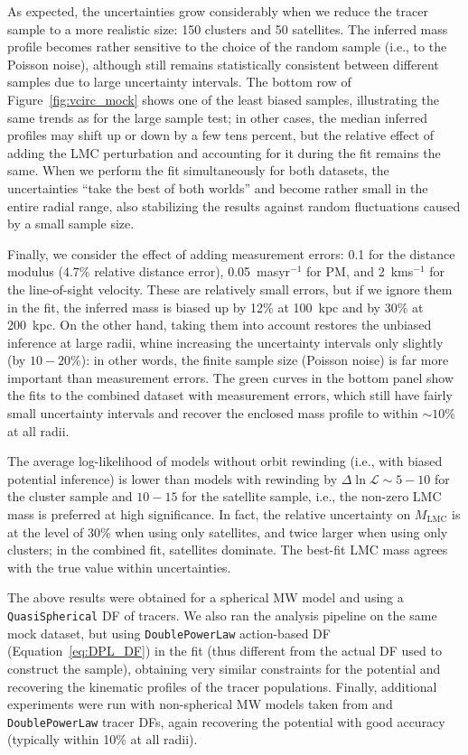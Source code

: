 \documentclass[usenatbib,fleqn]{mnras}
\newcommand{\kms}{km\:s$^{-1}$\xspace}
\newcommand{\masyr}{mas\:yr$^{-1}$\xspace}
\begin{document}
As expected, the uncertainties grow considerably when we reduce the tracer sample to a more realistic size: 150 clusters and 50 satellites. The inferred mass profile becomes rather sensitive to the choice of the random sample (i.e., to the Poisson noise), although still remains statistically consistent between different samples due to large uncertainty intervals. The bottom row of Figure~\ref{fig:vcirc_mock} shows one of the least biased samples, illustrating the same trends as for the large sample test; in other cases, the median inferred profiles may shift up or down by a few tens percent, but the relative effect of adding the LMC perturbation and accounting for it during the fit remains the same. When we perform the fit simultaneously for both datasets, the uncertainties ``take the best of both worlds'' and become rather small in the entire radial range, also stabilizing the results against random fluctuations caused by a small sample size.

Finally, we consider the effect of adding measurement errors: 0.1 for the distance modulus (4.7\% relative distance error), 0.05~\masyr for PM, and 2~\kms for the line-of-sight velocity. These are relatively small errors, but if we ignore them in the fit, the inferred mass is biased up by 12\% at 100~kpc and by 30\% at 200~kpc. On the other hand, taking them into account restores the unbiased inference at large radii, whine increasing the uncertainty intervals only slightly (by $10-20$\%): in other words, the finite sample size (Poisson noise) is far more important than measurement errors. The green curves in the bottom panel show the fits to the combined dataset with measurement errors, which still have fairly small uncertainty intervals and recover the enclosed mass profile to within $\sim10\%$ at all radii.

The average log-likelihood of models without orbit rewinding (i.e., with biased potential inference) is lower than models with rewinding by $\Delta\ln\mathcal L\sim 5-10$ for the cluster sample and $10-15$ for the satellite sample, i.e., the non-zero LMC mass is preferred at high significance. In fact, the relative uncertainty on $M_\text{LMC}$ is at the level of 30\% when using only satellites, and twice larger when using only clusters; in the combined fit, satellites dominate. The best-fit LMC mass agrees with the true value within uncertainties.

The above results were obtained for a spherical MW model and using a \texttt{QuasiSpherical} DF of tracers. We also ran the analysis pipeline on the same mock dataset, but using \texttt{DoublePowerLaw} action-based DF (Equation~\ref{eq:DPL_DF}) in the fit (thus different from the actual DF used to construct the sample), obtaining very similar constraints for the potential and recovering the kinematic profiles of the tracer populations. Finally, additional experiments were run with non-spherical MW models taken from \citet{Vasiliev2021b} and \texttt{DoublePowerLaw} tracer DFs, again recovering the potential with good accuracy (typically within 10\% at all radii).
\end{document}
